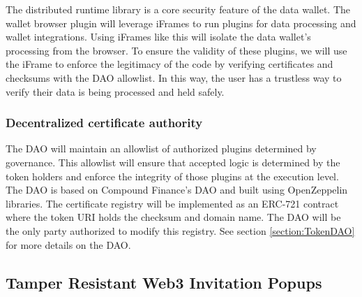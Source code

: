 The distributed runtime library is a core security feature of the data wallet. The wallet browser plugin will leverage iFrames to run plugins for data processing and wallet integrations. Using iFrames like this will isolate the data wallet's processing from the browser. To ensure the validity of these plugins, we will use the iFrame to enforce the legitimacy of the code by verifying certificates and checksums with the DAO allowlist. In this way, the user has a trustless way to verify their data is being processed and held safely.

\subsubsection{Decentralized certificate authority}
\label{section:DAO}
The DAO will maintain an allowlist of authorized plugins determined by governance. This allowlist will ensure that accepted logic is determined by the token holders and enforce the integrity of those plugins at the execution level. The DAO is based on Compound Finance's DAO and built using OpenZeppelin libraries. The certificate registry will be implemented as an ERC-721 contract where the token URI holds the checksum and domain name. The DAO will be the only party authorized to modify this registry. See section \ref{section:TokenDAO} for more details on the DAO.

\subsection{Tamper Resistant Web3 Invitation Popups}
\label{section:Web3Popus}



